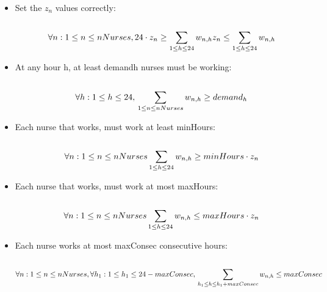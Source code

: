 \begin{itemize}
\item  Set the $z_n$ values correctly: \\ \\
\begin{equation}
 \forall n: 1 \leq n \leq nNurses,  \\
	24 \cdot z_{n}  \geq \sum\limits_{1 \leq h \leq 24} w_{n,h} \\
   z_{n} \leq \sum\limits_{1 \leq h \leq 24} w_{n,h}
 \end{equation}

\item  At any hour h, at least demandh nurses must be working: \\ \\
\begin{equation}
\forall h : 1 \leq h \leq 24, \\
 \sum\limits_{1 \leq n \leq nNurses} w_{n,h} \geq demand_{h} \\
\end{equation}

\item  Each nurse that works, must work at least minHours: \\ \\
\begin{equation}
\forall n: 1 \leq n \leq nNurses \\
	\sum\limits_{1 \leq h \leq 24} w_{n,h} \geq minHours \cdot z_{n} \\
\end{equation}

\item  Each nurse that works, must work at most maxHours: \\ \\
\begin{equation}
\forall n: 1 \leq n \leq nNurses \\
	\sum\limits_{1 \leq h \leq 24} w_{n,h} \leq maxHours \cdot z_{n} \\
\end{equation}

\item  Each nurse works at most maxConsec consecutive hours: \\ \\
\begin{equation}
\forall n:  1 \leq n \leq nNurses, \\
	\forall h_{1}:  1 \leq h_{1} \leq 24 - maxConsec, \\
	\sum\limits_{ h_{1} \leq h \leq h_{1} + maxConsec} w_{n,h} \leq maxConsec
\end{equation}


\end{itemize}
